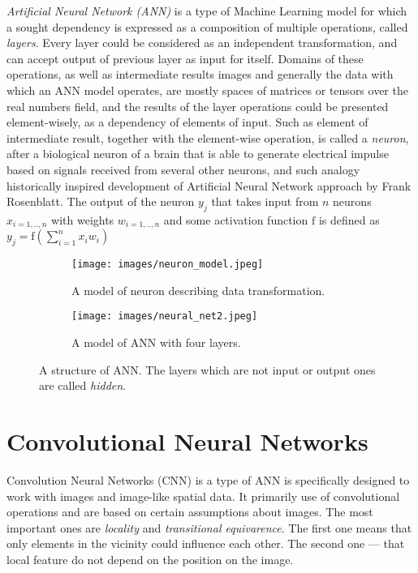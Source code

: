 \emph{Artificial Neural Network (ANN)} is a type of Machine Learning model for which a sought dependency is expressed as a composition of multiple operations, called \emph{layers}.
Every layer could be considered as an independent transformation, and can accept output of previous layer as input for itself.
Domains of these operations, as well as intermediate results images and generally the data with which an ANN model operates, are mostly spaces of matrices or tensors over the real numbers field, and the results of the layer operations could be presented element-wisely, as a dependency of elements of input.
Such as element of intermediate result, together with the element-wise operation, is called a \emph{neuron}, after a biological neuron of a brain that is able to generate electrical impulse based on signals received from several other neurons, and such analogy historically inspired development of Artificial Neural Network approach by Frank Rosenblatt\cite{}.
The output of the neuron $y_{j}$ that takes input from $n$ neurons $x_{i=1,..,n}$ with weights $w_{i=1,..,n}$ and some activation function $\mathrm{f}$ is defined as $ y_{j}=\mathrm{f}(\sum_{i=1}^{n} x_{i}w_{i})$
\medskip
\begin{figure}[ht]
\begin{subfigure}[b]{0.6\linewidth}
	\texttt{[image: images/neuron\_model.jpeg]}
	\caption{A model of neuron describing data transformation.}
	\label{fig:neuron1}
\end{subfigure}
\begin{subfigure}[b]{0.4\linewidth}
	\texttt{[image: images/neural\_net2.jpeg]}
	\caption{A model of ANN with four layers. }
	\label{fig:neuron2}
\end{subfigure}
\caption{A structure of ANN. The layers which are not input or output ones are called \emph{hidden}.}
\label{fig:nngen}
\end{figure}


\section{Convolutional Neural Networks}

Convolution Neural Networks (CNN) is a type of ANN is specifically designed to work with images and image-like spatial data.
It primarily use of convolutional operations and are based on certain assumptions about images.
The most important ones are \emph{locality} and \emph{transitional equivarence}.
The first one means that only elements in the vicinity could influence each other.
The second one --- that local feature do not depend on the position on the image.



